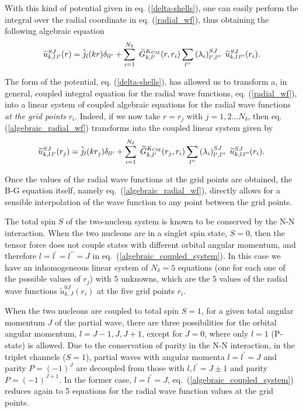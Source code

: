 \documentclass[aps,twocolumn,showpacs,preprintnumbers,amsmath,amssymb,nofootinbib,superscriptaddress,showkeys,noeprint]{revtex4-1}
\begin{document}
With this kind of potential given in eq. (\ref{delta-shells}), one can
easily perform the integral over the radial coordinate in
eq. (\ref{radial_wf}), thus obtaining the following algebraic equation
\begin{equation}\label{algebraic_radial_wf}
\widetilde{u}^{SJ}_{k,l\,l^\prime}(r)=
\hat{j}_l(kr)\delta_{ll^\prime} + \sum^{N_\delta}_{i=1}\;
\widetilde{G}^{K_{\rm CM}}_{k,l^\prime}(r,r_i)
\sum_{l^{\prime\prime}} \left(\lambda_i \right)^{SJ}_{l^\prime,l^{\prime\prime}} \;
\widetilde{u}^{SJ}_{k,l\,l^{\prime\prime}}(r_i).
\end{equation}

The form of the potential, eq. (\ref{delta-shells}), has allowed us to
transform a, in general, coupled integral equation for the radial wave
functions, eq. (\ref{radial_wf}), into a linear system of coupled
algebraic equations for the radial wave functions \emph{at the grid
points} $r_i$. Indeed, if we now take $r=r_j$ with $j=1,2\dots
N_\delta$, then eq.  (\ref{algebraic_radial_wf}) transforms into the
coupled linear system given by
\begin{equation}\label{algebraic_coupled_system}
\widetilde{u}^{SJ}_{k,l\,l^\prime}(r_j)=
\hat{j}_l(kr_j)\delta_{ll^\prime} + \sum^{N_\delta}_{i=1}\;
\widetilde{G}^{K_{\rm CM}}_{k,l^\prime}(r_j,r_i)
\sum_{l^{\prime\prime}} \left(\lambda_i \right)^{SJ}_{l^\prime,l^{\prime\prime}} \;
\widetilde{u}^{SJ}_{k,l\,l^{\prime\prime}}(r_i).
\end{equation}

Once the values of the radial wave functions at the grid points are
obtained, the B-G equation itself, namely
eq.~(\ref{algebraic_radial_wf}), directly allows for a sensible
interpolation of the wave function to any point between the grid
points.

The total spin $S$ of the two-nucleon system is known to be conserved
by the N-N interaction. When the two nucleons are in a singlet spin
state, $S=0$, then the tensor force does not couple states with
different orbital angular momentum, and therefore
$l=l^\prime=l^{\prime\prime}=J$ in
eq.~(\ref{algebraic_coupled_system}). In this case we have an
inhomogeneous linear system of $N_\delta=5$ equations (one for each
one of the possible values of $r_j$) with 5 unknowns, which are the 5
values of the radial wave functions $\widetilde{u}^{0J}_{k,J}(r_i)$ at
the five grid points $r_i$.

When the two nucleons are coupled to total spin $S=1$, for a given
total angular momentum $J$ of the partial wave, there are three
possibilities for the orbital angular momentum, $l=J-1,J,J+1$, except
for $J=0$, where only $l=1$ (P-state) is allowed. Due to the
conservation of parity in the N-N interaction, in the triplet channels
($S=1$), partial waves with angular momenta $l=l^\prime=J$ and parity
$P=(-1)^J$ are decoupled from those with $l,l^\prime=J\pm1$ and parity
$P=(-1)^{J+1}$.  In the former case, $l=l^\prime=J$,
eq.~(\ref{algebraic_coupled_system}) reduces again to 5 equations for
the radial wave function values at the grid points.
\end{document}

